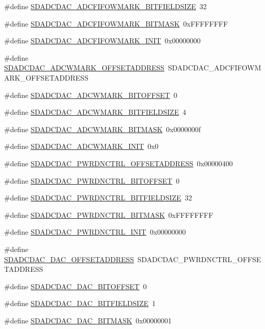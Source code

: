 \begin{DoxyCompactItemize}
\item 
\#define \hyperlink{a00569_a9002b59feba6a2499725cb5546fe54c7}{SDADCDAC\_\-ADCFIFOWMARK\_\-BITFIELDSIZE}~32
\item 
\#define \hyperlink{a00569_aec9c379b4c45973163781cce72b44993}{SDADCDAC\_\-ADCFIFOWMARK\_\-BITMASK}~0xFFFFFFFF
\item 
\#define \hyperlink{a00569_a4ef48689fcddb185629bec089eb8c521}{SDADCDAC\_\-ADCFIFOWMARK\_\-INIT}~0x00000000
\item 
\#define \hyperlink{a00569_a622b09e5ddac722a90d769a6277329bc}{SDADCDAC\_\-ADCWMARK\_\-OFFSETADDRESS}~SDADCDAC\_\-ADCFIFOWMARK\_\-OFFSETADDRESS
\item 
\#define \hyperlink{a00569_a111c2bd3a6195fb1b6d6965258ae7480}{SDADCDAC\_\-ADCWMARK\_\-BITOFFSET}~0
\item 
\#define \hyperlink{a00569_aa57aa84fcf2578e96b54b56c7cd289ab}{SDADCDAC\_\-ADCWMARK\_\-BITFIELDSIZE}~4
\item 
\#define \hyperlink{a00569_a7e1a9f59c04db6a809e8746615fb924b}{SDADCDAC\_\-ADCWMARK\_\-BITMASK}~0x0000000f
\item 
\#define \hyperlink{a00569_a28ebbc999e75b6f6281a42456e930278}{SDADCDAC\_\-ADCWMARK\_\-INIT}~0x0
\item 
\#define \hyperlink{a00569_a85656ee260f31c94e7f409584cdae893}{SDADCDAC\_\-PWRDNCTRL\_\-OFFSETADDRESS}~0x00000400
\item 
\#define \hyperlink{a00569_a3cc3e9dab7a25454e8fb0cc3cca3deee}{SDADCDAC\_\-PWRDNCTRL\_\-BITOFFSET}~0
\item 
\#define \hyperlink{a00569_a00baba02e48c2f36580168f06ff39942}{SDADCDAC\_\-PWRDNCTRL\_\-BITFIELDSIZE}~32
\item 
\#define \hyperlink{a00569_a3ce81cb19282ddad2037b735c1c7608d}{SDADCDAC\_\-PWRDNCTRL\_\-BITMASK}~0xFFFFFFFF
\item 
\#define \hyperlink{a00569_a9939e316b133dc1e04fa05a3dc9ee691}{SDADCDAC\_\-PWRDNCTRL\_\-INIT}~0x00000000
\item 
\#define \hyperlink{a00569_a3707374c7557819bd86d9285172d3077}{SDADCDAC\_\-DAC\_\-OFFSETADDRESS}~SDADCDAC\_\-PWRDNCTRL\_\-OFFSETADDRESS
\item 
\#define \hyperlink{a00569_a1e4a55e02942913b872fba0bf9fab9d8}{SDADCDAC\_\-DAC\_\-BITOFFSET}~0
\item 
\#define \hyperlink{a00569_a74ec9f96d9af1c7a8351637f1a0f4029}{SDADCDAC\_\-DAC\_\-BITFIELDSIZE}~1
\item 
\#define \hyperlink{a00569_a89cc856390cc9a8b6a67041536fc0225}{SDADCDAC\_\-DAC\_\-BITMASK}~0x00000001

\end{DoxyCompactItemize}
